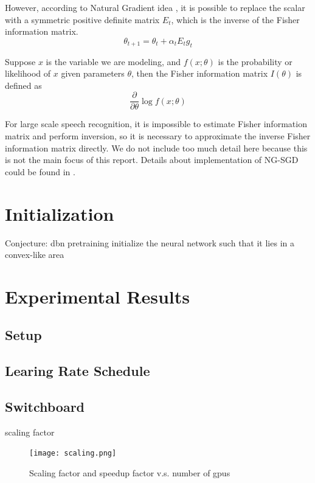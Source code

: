 \documentclass{article}
\begin{document}
However, according to Natural Gradient idea \cite{murata1999statistical,roux2008topmoumoute}, it is possible to replace 
the scalar with a symmetric positive definite matrix $E_t$, which is the inverse of the Fisher information matrix.
\begin{equation}
\theta_{t+1} = \theta_{t} + \alpha_t E_t g_t
\end{equation}

Suppose $x$ is the variable we are modeling, and $f(x;\theta)$ is the probability or likelihood of $x$ given parameters $\theta$, then the
Fisher information matrix $I(\theta)$ is defined as
\begin{equation}
\frac{\partial}{\partial\theta}\log f(x;\theta)
\end{equation}

For large scale speech recognition, it is impossible to estimate Fisher information matrix and perform inversion, 
so it is necessary to approximate the inverse Fisher information matrix directly. We do not include too much 
detail here because this is not the main focus of this report. Details about implementation of NG-SGD could 
be found in \cite{povey2014parallel}.

\section{Initialization}
Conjecture: dbn pretraining initialize the neural network such that it lies in a convex-like area

\section{Experimental Results}
\subsection{Setup}

\subsection{Learing Rate Schedule}


\subsection{Switchboard}

scaling factor
\begin{figure}[htb]
  \centering
  \texttt{[image: scaling.png]}
  \caption{Scaling factor and speedup factor v.s. number of gpus}
  \label{fig:scaling}
\end{figure}
\end{document}
